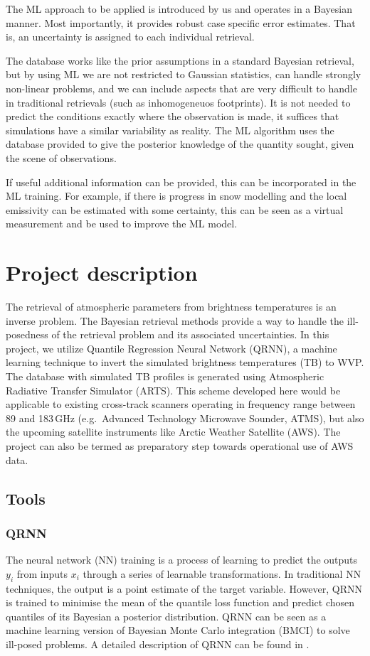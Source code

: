 \documentclass[12pt,oneside,a4paper]{article}
\begin{document}
The ML approach to be applied is introduced by us and operates in a Bayesian
manner. Most importantly, it provides robust case specific error estimates.
That is, an uncertainty is assigned to each individual retrieval.

The database works like the prior assumptions in a standard Bayesian retrieval,
but by using ML we are not restricted to Gaussian statistics, can handle
strongly non-linear problems, and we can include aspects that are very
difficult to handle in traditional retrievals (such as inhomogeneuos
footprints). It is not needed to predict the conditions exactly where the
observation is made, it suffices that simulations have a similar variability as
reality. The ML algorithm uses the database provided to give the posterior
knowledge of the quantity sought, given the scene of observations.

If useful additional information can be provided, this can be incorporated in
the ML training. For example, if there is progress in snow modelling and the
local emissivity can be estimated with some certainty, this can be seen as a
virtual measurement and be used to improve the ML model.



\section{Project description}

The retrieval of atmospheric parameters from brightness temperatures is an inverse problem. The Bayesian retrieval methods provide a way to handle the ill-posedness of the retrieval problem and its associated uncertainties. In this project, we utilize  Quantile Regression Neural Network (QRNN), a machine learning technique to invert the simulated brightness temperatures (TB) to WVP. The database with simulated TB profiles is generated using Atmospheric Radiative Transfer Simulator (ARTS). This scheme developed here would be applicable to existing cross-track scanners operating in frequency range between 89 and 183\,GHz (e.g.\, Advanced Technology Microwave Sounder, ATMS), but also the upcoming satellite instruments like Arctic Weather Satellite (AWS). The project can also be termed as preparatory step towards operational use of AWS data.
 
\subsection{Tools}
\subsubsection{QRNN}
%
\label{sec:qrnn}
The neural network (NN) training is a process of learning to predict the outputs {$y_i$} from inputs {$x_i$} through a series of learnable transformations. In traditional NN techniques, the output is a point estimate of the target variable. However, QRNN is trained to minimise the mean of the quantile loss function and predict chosen quantiles of its Bayesian a posterior distribution. QRNN can be seen as a machine learning version of Bayesian Monte Carlo integration (BMCI) to solve ill-posed problems. A detailed description of QRNN can be found in \citet{pfreundschuh:aneur:18}.  
\end{document}
